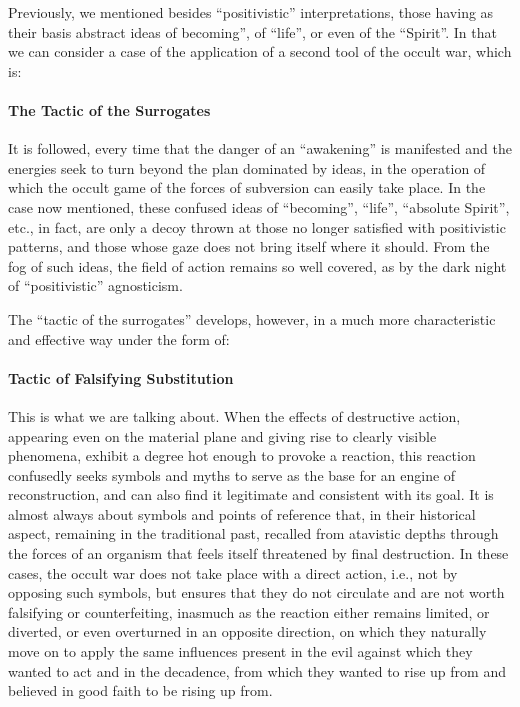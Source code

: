 Previously, we mentioned besides ``positivistic'' interpretations, those having as their basis abstract ideas of becoming'', of ``life'', or even of the ``Spirit''. In that we can consider a case of the application of a second tool of the occult war, which is:

\paragraph{The Tactic of the Surrogates}


It is followed, every time that the danger of an ``awakening'' is manifested and the energies seek to turn beyond the plan dominated by ideas, in the operation of which the occult game of the forces of subversion can easily take place. In the case now mentioned, these confused ideas of ``becoming'', ``life'', ``absolute Spirit'', etc., in fact, are only a decoy thrown at those no longer satisfied with positivistic patterns, and those whose gaze does not bring itself where it should. From the fog of such ideas, the field of action remains so well covered, as by the dark night of ``positivistic'' agnosticism.

The ``tactic of the surrogates'' develops, however, in a much more characteristic and effective way under the form of:

\paragraph{Tactic of Falsifying Substitution}

This is what we are talking about. When the effects of destructive action, appearing even on the material plane and giving rise to clearly visible phenomena, exhibit a degree hot enough to provoke a reaction, this reaction confusedly seeks symbols and myths to serve as the base for an engine of reconstruction, and can also find it legitimate and consistent with its goal. It is almost always about symbols and points of reference that, in their historical aspect, remaining in the traditional past, recalled from atavistic depths through the forces of an organism that feels itself threatened by final destruction. In these cases, the occult war does not take place with a direct action, i.e., not by opposing such symbols, but ensures that they do not circulate and are not worth falsifying or counterfeiting, inasmuch as the reaction either remains limited, or diverted, or even overturned in an opposite direction, on which they naturally move on to apply the same influences present in the evil against which they wanted to act and in the decadence, from which they wanted to rise up from and believed in good faith to be rising up from.

